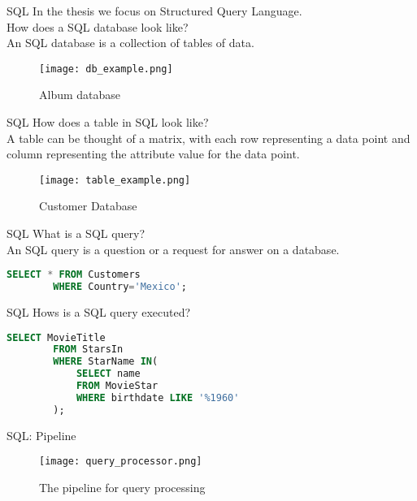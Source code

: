 \begin{frame}{SQL}
    In the thesis we focus on Structured Query Language.\\
    How does a SQL database look like?\\
    An SQL database is a collection of tables of data.
    \begin{figure}
        \centering
        \texttt{[image: db\_example.png]}\\
        \caption{Album database}
        \label{fig:db_ex}
    \end{figure}
\end{frame}
    
\begin{frame}{SQL}
    How does a table in SQL look like?\\
    A table can be thought of a matrix, with each row representing a data point and column representing the attribute value for the data point.
    \begin{figure}
        \centering
        \texttt{[image: table\_example.png]}\\
        \caption{Customer Database}
        \label{fig:table_ex}
    \end{figure}
\end{frame}

\begin{frame}[fragile]{SQL}
    What is a SQL query? \\
    An SQL query is a question or a request for answer on a database.
    \begin{lstlisting}[language=SQL,caption=SQL statement selects all the customers from the country "Mexico" in the "Customers" table, label={lst:sql_ex}]
        SELECT * FROM Customers
        WHERE Country='Mexico';
    \end{lstlisting}
\end{frame}

\begin{frame}[fragile]{SQL}
    Hows is a SQL query executed?
    \begin{lstlisting}[language=SQL, caption= SQL query to convert]
        SELECT MovieTitle
        FROM StarsIn
        WHERE StarName IN(
            SELECT name
            FROM MovieStar
            WHERE birthdate LIKE '%1960'
        );
    \end{lstlisting}
\end{frame}

\begin{frame}{SQL: Pipeline}
    \begin{figure}
        \centering
        \texttt{[image: query\_processor.png]}\\
        \caption{The pipeline for query processing}
        \label{fig:query_processor}
    \end{figure}
\end{frame}

